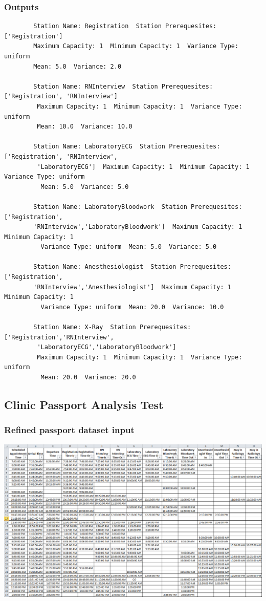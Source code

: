\documentclass[12pt]{article}
\begin{document}
		\subsubsection{Outputs}
		\begin{verbatim}
		Station Name: Registration  Station Prerequesites: ['Registration']  
		Maximum Capacity: 1  Minimum Capacity: 1  Variance Type: uniform  
		Mean: 5.0  Variance: 2.0
	
		Station Name: RNInterview  Station Prerequesites: ['Registration', 'RNInterview'] 
		 Maximum Capacity: 1  Minimum Capacity: 1  Variance Type: uniform  
		 Mean: 10.0  Variance: 10.0
		
		Station Name: LaboratoryECG  Station Prerequesites: ['Registration', 'RNInterview',
		 'LaboratoryECG']  Maximum Capacity: 1  Minimum Capacity: 1  Variance Type: uniform 
		  Mean: 5.0  Variance: 5.0
	
		Station Name: LaboratoryBloodwork  Station Prerequesites: ['Registration', 
		'RNInterview','LaboratoryBloodwork']  Maximum Capacity: 1  Minimum Capacity: 1
		  Variance Type: uniform  Mean: 5.0  Variance: 5.0
		  
		Station Name: Anesthesiologist  Station Prerequesites: ['Registration', 
		'RNInterview','Anesthesiologist']  Maximum Capacity: 1  Minimum Capacity: 1
		  Variance Type: uniform  Mean: 20.0  Variance: 10.0
		  
		Station Name: X-Ray  Station Prerequesites: ['Registration','RNInterview',
		 'LaboratoryECG','LaboratoryBloodwork']  
		 Maximum Capacity: 1  Minimum Capacity: 1  Variance Type: uniform 
		  Mean: 20.0  Variance: 20.0
		\end{verbatim}
		
		
		\subsection{Clinic Passport Analysis Test}\label{passportcreate}
		\subsubsection{Refined passport dataset input}
\includegraphics[scale=0.5]{dataanalysis.png}	
\end{document}
